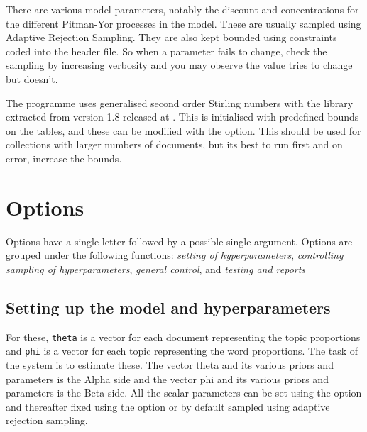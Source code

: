 \documentclass[a4paper,english]{article}
\begin{document}
There are various model parameters, notably the
discount and concentrations for the different Pitman-Yor
processes in the model.
These are usually sampled using Adaptive Rejection Sampling.
They are also kept bounded using constraints coded
into the  header file.
So when a parameter fails to change, check the sampling
by increasing verbosity and you may observe the value tries to 
change but doesn't.

The programme uses generalised second order Stirling numbers
with the library extracted from  version 1.8
released at .
This is initialised with predefined bounds on the tables,
and these can be modified with the  option.
This should be used for collections with larger  numbers of
documents, but its best to run first and on
error, increase the bounds.

\section{Options}

Options have a single letter followed by a possible
single argument.  Options are grouped under
the following functions:
\emph{setting of hyperparameters}, 
\emph{controlling sampling of hyperparameters},
\emph{general control}, and
\emph{testing and reports}

\subsection{Setting up the model and hyperparameters}
For these, \texttt{theta} is a vector for each document representing the
topic proportions and
 \texttt{phi} is a vector for each topic representing the
word proportions.  The task of the system is to estimate these.
The vector theta and its various priors and parameters is the Alpha side
and the vector phi and its various priors and parameters is the Beta side.
All the scalar parameters can be set using the 
 option 
and thereafter fixed using the  option
or by default sampled
using adaptive rejection sampling.
\end{document}
